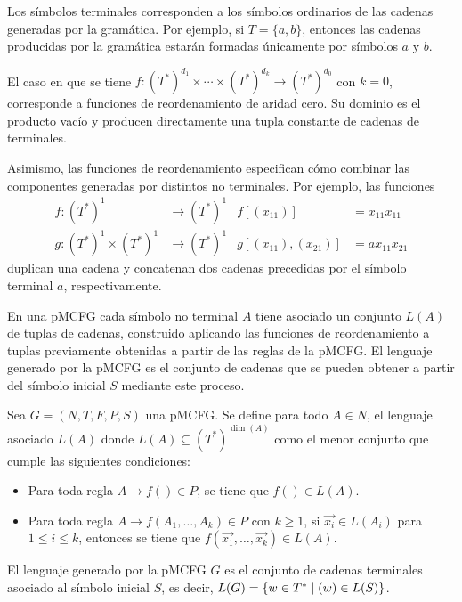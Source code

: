 Los símbolos terminales corresponden a los símbolos ordinarios de las cadenas generadas por la gramática. Por ejemplo, si $T=\{a,b\}$, entonces las cadenas producidas por la gramática estarán formadas únicamente por símbolos $a$ y $b$.

El caso en que se tiene $f : (T^*)^{d_1} \times \cdots \times (T^*)^{d_k} \to (T^*)^{d_0}$ con $k = 0$, corresponde a funciones de reordenamiento de aridad cero. Su dominio es el producto vacío y producen directamente una tupla constante de cadenas de terminales.

Asimismo, las funciones de reordenamiento especifican cómo combinar las componentes generadas por distintos no terminales. Por ejemplo, las funciones
$$
    \begin{aligned}
        f : (T^*)^1 & \to (T^*)^1
                    &
        f[(x_{11})] & = x_{11}x_{11}
        \\[0.4em]
        g : (T^*)^1 \times (T^*)^1
                    & \to (T^*)^1
                    &
        g[(x_{11}), (x_{21})]
                    & = ax_{11}x_{21}
    \end{aligned}
$$
duplican una cadena y concatenan dos cadenas precedidas por el símbolo terminal $a$, respectivamente.



En una pMCFG cada símbolo no terminal $A$ tiene asociado un conjunto $L(A)$ de tuplas de cadenas, construido aplicando las funciones de reordenamiento a tuplas previamente obtenidas a partir de las reglas de la pMCFG. El lenguaje generado por la pMCFG es el conjunto de cadenas que se pueden obtener a partir del símbolo inicial $S$ mediante este proceso.

\begin{definition}
    \label{def:nt-lang}
    Sea $G = (N, T, F, P, S)$ una pMCFG. Se define para todo $A \in N$, el lenguaje asociado $L(A)$ donde $L(A) \subseteq (T^*)^{\dim(A)}$ como  el menor conjunto que cumple las siguientes condiciones:
    \begin{itemize}
        \item Para toda regla $A \to f() \in P$, se tiene que $f() \in L(A)$.
        \item Para toda regla $A \to f(A_1, \ldots, A_k) \in P$ con $k \geq 1$, si $\vec{x_i} \in L(A_i)$ para $1 \leq i \leq k$, entonces se tiene que $f(\vec{x_1}, \ldots, \vec{x_k}) \in L(A)$.
    \end{itemize}

    El lenguaje generado por la pMCFG $G$ es el conjunto de cadenas terminales asociado al símbolo inicial $S$, es decir, $L(G) = \{ w \in T^* \;|\; (w) \in L(S) \}$.
\end{definition}


